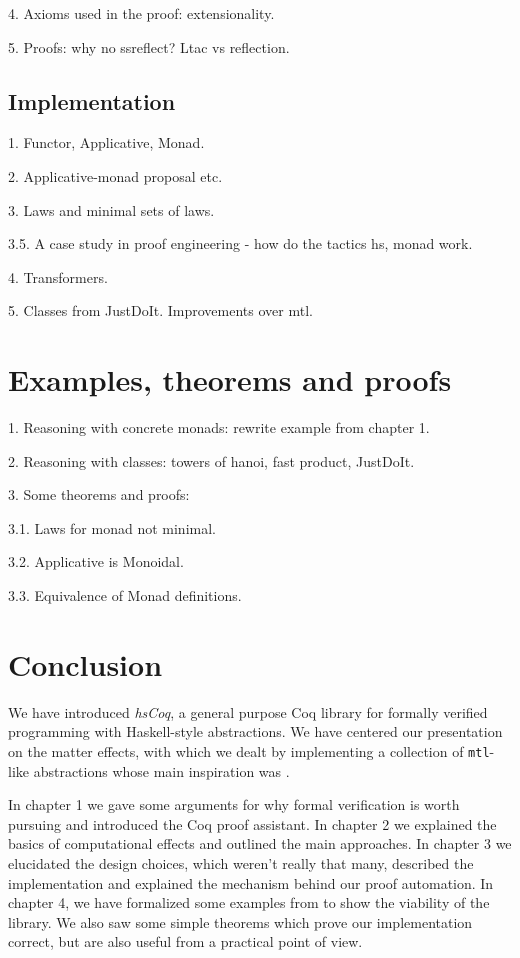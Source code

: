 \documentclass[declaration,inz,english,shortabstract]{iithesis}
\newcommand{\libname}{\textit{hsCoq}}
\newcommand{\m}[1]{\texttt{#1}}
\begin{document}
4. Axioms used in the proof: extensionality.

5. Proofs: why no ssreflect? Ltac vs reflection.

\section{Implementation}

1. Functor, Applicative, Monad.

2. Applicative-monad proposal etc.

3. Laws and minimal sets of laws.

3.5. A case study in proof engineering - how do the tactics hs, monad work.

4. Transformers.

5. Classes from JustDoIt. Improvements over mtl.

\chapter{Examples, theorems and proofs}

1. Reasoning with concrete monads: rewrite example from chapter 1.

2. Reasoning with classes: towers of hanoi, fast product, JustDoIt.

3. Some theorems and proofs:

3.1. Laws for monad not minimal.

3.2. Applicative is Monoidal.

3.3. Equivalence of Monad definitions.

\chapter{Conclusion}

We have introduced \libname, a general purpose Coq library for formally verified programming with Haskell-style abstractions. We have centered our presentation on the matter effects, with which we dealt by implementing a collection of \m{mtl}-like abstractions whose main inspiration was \cite{JustDoIt}.

In chapter 1 we gave some arguments for why formal verification is worth pursuing and introduced the Coq proof assistant. In chapter 2 we explained the basics of computational effects and outlined the main approaches. In chapter 3 we elucidated the design choices, which weren't really that many, described the implementation and explained the mechanism behind our proof automation. In chapter 4, we have formalized some examples from \cite{JustDoIt} to show the viability of the library. We also saw some simple theorems which prove our implementation correct, but are also useful from a practical point of view.
\end{document}
